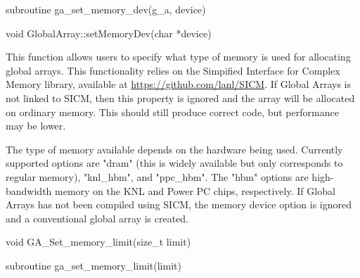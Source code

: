 \documentclass[12pt]{article}
\begin{document}
\begin{fapi}
\begin{fcode}
subroutine ga_set_memory_dev(g_a, device)
\end{fcode}
\begin{funcargs}
\end{funcargs}
\end{fapi}

\begin{cxxapi}
\begin{cxxcode}
void GlobalArray::setMemoryDev(char *device)
\end{cxxcode}
\begin{funcargs}
\end{funcargs}
\end{cxxapi}

\gcoll

\begin{desc}

This function allows users to specify what type of memory is used for allocating
global arrays. This functionality relies on the Simpified Interface for Complex
Memory library, available at
\href{https://github.com/lanl/SICM}{https://github.com/lanl/SICM}. If Global Arrays is
not linked to SICM, then this property is ignored and the array will be
allocated on ordinary memory. This should still produce correct code, but
performance may be lower.

The type of memory available depends on the hardware being used. Currently
supported options are "dram" (this is widely available but only corresponds to
regular memory), "knl_hbm", and "ppc_hbm". The "hbm" options are high-bandwidth
memory on the KNL and Power PC chips, respectively. If Global Arrays has not been
compiled using SICM, the memory device option is ignored and a conventional
global array is created.
\end{desc}


\begin{capi}
\begin{ccode}
void GA_Set_memory_limit(size_t limit)
\end{ccode}
\begin{funcargs}
\end{funcargs}
\end{capi}
\begin{fapi}
\begin{fcode}
subroutine ga_set_memory_limit(limit)
\end{fcode}
\begin{funcargs}
\end{funcargs}
\end{fapi}
\end{document}
